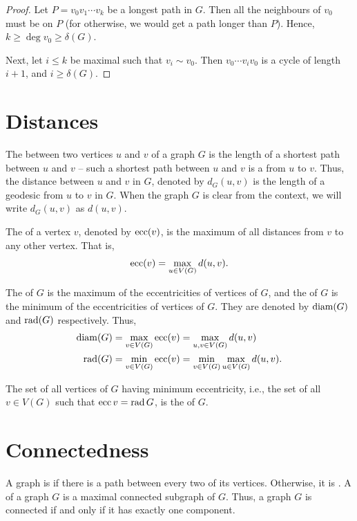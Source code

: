 \begin{proof}
Let $P = v_0 v_1 \cdots v_k$ be a longest path in $G$. Then all the neighbours of $v_0$ must be on $P$ (for otherwise, we would get a path longer than $P$). Hence, $k \ge \deg v_0 \ge \delta(G)$.

Next, let $i \le k$ be maximal such that $v_i \sim v_0$. Then $v_0 \cdots v_i v_0$ is a cycle of length $i + 1$, and $i \ge \delta(G)$.
\end{proof}


\section{Distances}\label{sec:Distances}

The  between two vertices $u$ and $v$ of a graph $G$ is the length of a shortest path between $u$ and $v$ -- such a shortest path between $u$ and $v$ is a  from $u$ to $v$. Thus, the distance between $u$ and $v$ in $G$, denoted by $d_G(u, v)$ is the length of a geodesic from $u$ to $v$ in $G$. When the graph $G$ is clear from the context, we will write $d_G(u, v)$ as $d(u, v)$.

The  of a vertex $v$, denoted by $\operatorname{ecc}(v)$, is the maximum of all distances from $v$ to any other vertex. That is,
\begin{equation*}
    \operatorname{ecc}(v) = \max_{u \in V(G)} d(u, v) .
\end{equation*}

The  of $G$ is the maximum of the eccentricities of vertices of $G$, and the  of $G$ is the minimum of the eccentricities of vertices of $G$. They are denoted by $\operatorname{diam}(G)$ and $\operatorname{rad}(G)$ respectively. Thus,
\begin{align*}
    \operatorname{diam}(G) & = \max_{v \in V(G)} \operatorname{ecc}(v)= \max_{u, v \in V(G)} d(u, v) \\
    \operatorname{rad}(G) & = \min_{v \in V(G)}\operatorname{ecc}(v) = \min_{v \in V(G)} \max_{u \in V(G)} d(u, v).
\end{align*}

The set of all vertices of $G$ having minimum eccentricity, i.e., the set of all $v \in V(G)$ such that $\operatorname{ecc} v = \operatorname{rad} G$, is the  of $G$.


\section{Connectedness}\label{sec:Connectedness}

A graph is  if there is a path between every two of its vertices. Otherwise, it is . A  of a graph $G$ is a maximal connected subgraph of $G$. Thus, a graph $G$ is connected if and only if it has exactly one component.

